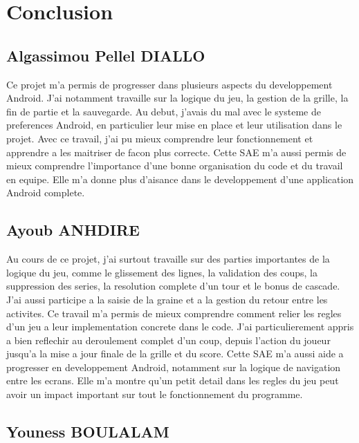 \documentclass[a4paper,12pt]{article}
\begin{document}
\section{Conclusion}

\subsection{Algassimou Pellel DIALLO}
Ce projet m'a permis de progresser dans plusieurs aspects du developpement
Android. J'ai notamment travaille sur la logique du jeu, la gestion de la
grille, la fin de partie et la sauvegarde.
Au debut, j'avais du mal avec le systeme de preferences Android, en
particulier leur mise en place et leur utilisation dans le projet. Avec ce
travail, j'ai pu mieux comprendre leur fonctionnement et apprendre a les
maitriser de facon plus correcte.
Cette SAE m'a aussi permis de mieux comprendre l'importance d'une bonne
organisation du code et du travail en equipe. Elle m'a donne plus d'aisance
dans le developpement d'une application Android complete.


\subsection{Ayoub ANHDIRE}
Au cours de ce projet, j'ai surtout travaille sur des parties importantes de la
logique du jeu, comme le glissement des lignes, la validation des coups, la
suppression des series, la resolution complete d'un tour et le bonus de
cascade. J'ai aussi participe a la saisie de la graine et a la gestion du
retour entre les activites.
Ce travail m'a permis de mieux comprendre comment relier les regles d'un jeu a
leur implementation concrete dans le code. J'ai particulierement appris a bien
reflechir au deroulement complet d'un coup, depuis l'action du joueur jusqu'a la
mise a jour finale de la grille et du score.
Cette SAE m'a aussi aide a progresser en developpement Android,
notamment sur la logique de navigation entre les ecrans. Elle m'a montre qu'un
petit detail dans les regles du jeu peut avoir un impact important sur tout le
fonctionnement du programme.

\subsection{Youness BOULALAM}
\end{document}
